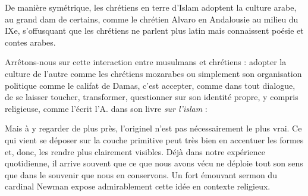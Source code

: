  De manière symétrique, les chrétiens en terre d'Islam adoptent la culture arabe, au grand dam de certains, comme le chrétien Alvaro en Andalousie au milieu du IXe, s'offusquant que les chrétiens ne parlent plus latin mais connaissent poésie et contes arabes.

Arrêtons-nous sur cette interaction entre musulmans et chrétiens : adopter la culture de l'autre comme les chrétiens mozarabes ou simplement son organisation politique comme le califat de Damas, c'est accepter, comme dans tout dialogue, de se laisser toucher, transformer, questionner sur son identité propre, y compris religieuse, comme l'écrit l'A. dans son livre \textit{sur l'islam} : 
\begin{singlequote}
    Mais à y regarder de plus près, l'originel n'est pas nécessairement le plus vrai. Ce qui vient se déposer sur la couche primitive peut très bien en accentuer les formes et, donc, les rendre plus clairement visibles. Déjà dans notre expérience quotidienne, il arrive souvent que ce que nous avons vécu ne déploie tout son sens que dans le souvenir que nous en conservons. Un fort émouvant sermon du cardinal Newman expose admirablement cette idée en contexte religieux. \cite[p. 84]{brague_sur_2023}
\end{singlequote}


